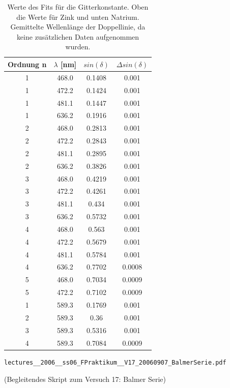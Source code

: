 \documentclass[]{article}
\begin{document}
\begin{table}[h]
\centering
\begin{tabular}{|c|c|c|c|}
\hline
Ordnung n & $\lambda$ [nm] & $sin(\delta)$ & $\Delta sin(\delta)$ \\ \hline\hline
1 & 468.0 & 0.1408 & 0.001 \\ \hline
1 & 472.2 & 0.1424 & 0.001 \\ \hline
1 & 481.1 & 0.1447 & 0.001 \\ \hline
1 & 636.2 & 0.1916 & 0.001 \\ \hline
2 & 468.0 & 0.2813 & 0.001 \\ \hline
2 & 472.2 & 0.2843 & 0.001 \\ \hline
2 & 481.1 & 0.2895 & 0.001 \\ \hline
2 & 636.2 & 0.3826 & 0.001 \\ \hline
3 & 468.0 & 0.4219 & 0.001 \\ \hline
3 & 472.2 & 0.4261 & 0.001 \\ \hline
3 & 481.1 & 0.434 & 0.001 \\ \hline
3 & 636.2 & 0.5732 & 0.001 \\ \hline
4 & 468.0 & 0.563 & 0.001 \\ \hline
4 & 472.2 & 0.5679 & 0.001 \\ \hline
4 & 481.1 & 0.5784 & 0.001 \\ \hline
4 & 636.2 & 0.7702 & 0.0008 \\ \hline
5 & 468.0 & 0.7034 & 0.0009 \\ \hline
5 & 472.2 & 0.7102 & 0.0009 \\ \hline
\hline \hline
1 & 589.3 & 0.1769 & 0.001 \\ \hline
2 & 589.3 & 0.36 & 0.001 \\ \hline
3 & 589.3 & 0.5316 & 0.001 \\ \hline
4 & 589.3 & 0.7084 & 0.0009 \\ \hline
\hline
\end{tabular}
\caption{Werte des Fits für die Gitterkonstante. Oben die Werte für Zink und unten Natrium. Gemittelte Wellenlänge der Doppellinie, da keine zusätzlichen Daten aufgenommen wurden.\label{c Data}}
\end{table}

\newpage
\begin{thebibliography}{}

 \begin{verbatim}
lectures__2006__ss06_FPraktikum__V17_20060907_BalmerSerie.pdf \end{verbatim} (Begleitendes Skript zum Versuch 17: Balmer Serie)

\end{thebibliography}
\end{document}
